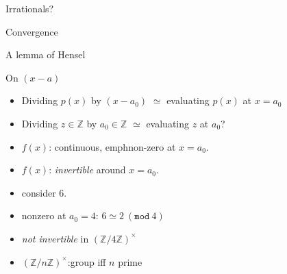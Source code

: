 \documentclass[8pt]{beamer}
\renewcommand{\mod}[1]{\left( \texttt{mod}~#1 \right)}
\begin{document}
\begin{frame}{Irrationals?}
\end{frame}


\begin{frame}{Convergence}
\end{frame}

\begin{frame}{A lemma of Hensel}
\end{frame}




\begin{frame}[fragile]{On $(x-a)$}
\begin{itemize}
\item Dividing $p(x)$ by $(x-a_0)$ $\simeq$ evaluating  $p(x)$ at $x = a_0$ \pause
\item Dividing $z \in \mathbb Z$ by $a_0 \in \mathbb Z$ $\simeq$ evaluating $z$ at $a_0$? \pause
\item $f(x)$: continuous, emph{non-zero} at $x = a_0$. \pause
\item $f(x)$: \emph{invertible} around $x = a_0$. \pause
\item consider $6$. \pause
\item nonzero at $a_0 = 4$: $6 \simeq 2~\mod{4}$\pause
\item \emph{not invertible} in $(\mathbb{Z}/4\mathbb{Z})^\times$ \pause
\item $(\mathbb{Z}/n\mathbb{Z})^\times$:group iff $n$ prime
\end{itemize}

\end{frame}
\end{document}
